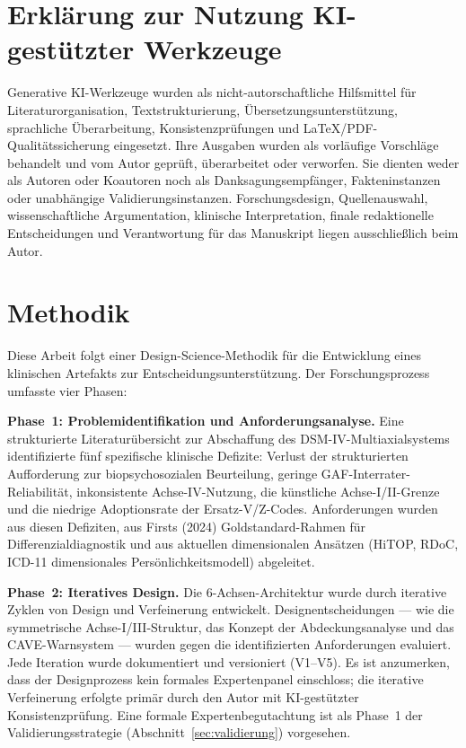 \documentclass[11pt,a4paper]{article}
\begin{document}
\section*{Erkl\"arung zur Nutzung KI-gest\"utzter Werkzeuge}

Generative KI-Werkzeuge wurden als nicht-autorschaftliche Hilfsmittel f\"ur Literaturorganisation, Textstrukturierung, \"Ubersetzungsunterst\"utzung, sprachliche \"Uberarbeitung, Konsistenzpr\"ufungen und LaTeX/PDF-Qualit\"atssicherung eingesetzt. Ihre Ausgaben wurden als vorl\"aufige Vorschl\"age behandelt und vom Autor gepr\"uft, \"uberarbeitet oder verworfen. Sie dienten weder als Autoren oder Koautoren noch als Danksagungsempf\"anger, Fakteninstanzen oder unabh\"angige Validierungsinstanzen. Forschungsdesign, Quellenauswahl, wissenschaftliche Argumentation, klinische Interpretation, finale redaktionelle Entscheidungen und Verantwortung f\"ur das Manuskript liegen ausschlie\ss{}lich beim Autor.

\newpage

\section{Methodik}

Diese Arbeit folgt einer Design-Science-Methodik f\"ur die Entwicklung eines klinischen Artefakts zur Entscheidungsunterst\"utzung. Der Forschungsprozess umfasste vier Phasen:

\textbf{Phase~1: Problemidentifikation und Anforderungsanalyse.} Eine strukturierte Literatur\"ubersicht zur Abschaffung des DSM-IV-Multiaxialsystems identifizierte f\"unf spezifische klinische Defizite: Verlust der strukturierten Aufforderung zur biopsychosozialen Beurteilung, geringe GAF-Interrater-Reliabilit\"at, inkonsistente Achse-IV-Nutzung, die k\"unstliche Achse-I/II-Grenze und die niedrige Adoptionsrate der Ersatz-V/Z-Codes. Anforderungen wurden aus diesen Defiziten, aus Firsts (2024) Goldstandard-Rahmen f\"ur Differenzialdiagnostik und aus aktuellen dimensionalen Ans\"atzen (HiTOP, RDoC, ICD-11 dimensionales Pers\"onlichkeitsmodell) abgeleitet.

\textbf{Phase~2: Iteratives Design.} Die 6-Achsen-Architektur wurde durch iterative Zyklen von Design und Verfeinerung entwickelt. Designentscheidungen --- wie die symmetrische Achse-I/III-Struktur, das Konzept der Abdeckungsanalyse und das CAVE-Warnsystem --- wurden gegen die identifizierten Anforderungen evaluiert. Jede Iteration wurde dokumentiert und versioniert (V1--V5). Es ist anzumerken, dass der Designprozess kein formales Expertenpanel einschloss; die iterative Verfeinerung erfolgte prim\"ar durch den Autor mit KI-gest\"utzter Konsistenzpr\"ufung. Eine formale Expertenbegutachtung ist als Phase~1 der Validierungsstrategie (Abschnitt~\ref{sec:validierung}) vorgesehen.
\end{document}
